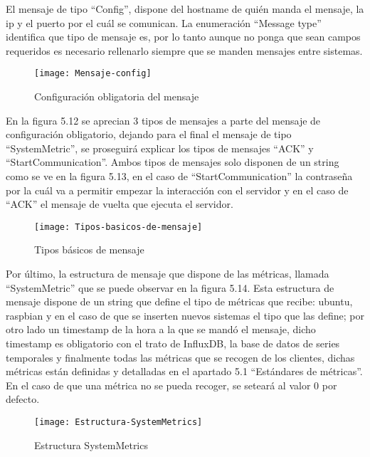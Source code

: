 \documentclass[ spanish, a4paper, 12pt, oneside]{report}
\begin{document}
El mensaje de tipo ``Config'', dispone del hostname de quién manda el mensaje, la ip y el puerto por el cuál se comunican. La enumeración ``Message type'' identifica que tipo de mensaje es, por lo tanto aunque no ponga 
que sean campos requeridos es necesario rellenarlo siempre que se manden mensajes entre sistemas. \\

\begin{figure}[!h]
   \centering
   \texttt{[image: Mensaje-config]}\\
      \caption{\label{fig: Configuración obligatoria del mensaje} Configuración obligatoria del mensaje}
\end{figure}

En la figura 5.12 se aprecian 3 tipos de mensajes a parte del mensaje de configuración obligatorio, dejando para el final el mensaje de tipo ``SystemMetric'', se proseguirá explicar los tipos de mensajes ``ACK'' y ``StartCommunication''. 
Ambos tipos de mensajes solo disponen de un string como se ve en la figura 5.13, en el caso de ``StartCommunication'' la contraseña por la cuál va a permitir empezar la interacción con el servidor y en el caso de ``ACK'' el mensaje 
de vuelta que ejecuta el servidor. \\

\begin{figure}[!h]
   \centering
   \texttt{[image: Tipos-basicos-de-mensaje]}\\
      \caption{\label{fig: Tipos básicos de mensaje} Tipos básicos de mensaje}
\end{figure}

Por último, la estructura de mensaje que dispone de las métricas, llamada ``SystemMetric'' que se puede observar en la figura 5.14. Esta estructura de mensaje dispone de un string que define el tipo de métricas que recibe: ubuntu, raspbian y 
en el caso de que se inserten nuevos sistemas el tipo que las define; por otro lado un timestamp de la hora a la que se mandó el mensaje, dicho timestamp es obligatorio con el trato de InfluxDB, la base de datos de series temporales y finalmente todas las 
métricas que se recogen de los clientes, dichas métricas están definidas y detalladas en el apartado 5.1 ``Estándares de métricas''. En el caso de que una métrica no se pueda recoger, se seteará al valor 0 por defecto.\\

\begin{figure}[!h]
   \centering
   \texttt{[image: Estructura-SystemMetrics]}\\
      \caption{\label{fig: Estructura SystemMetrics} Estructura SystemMetrics}
\end{figure}
\end{document}
